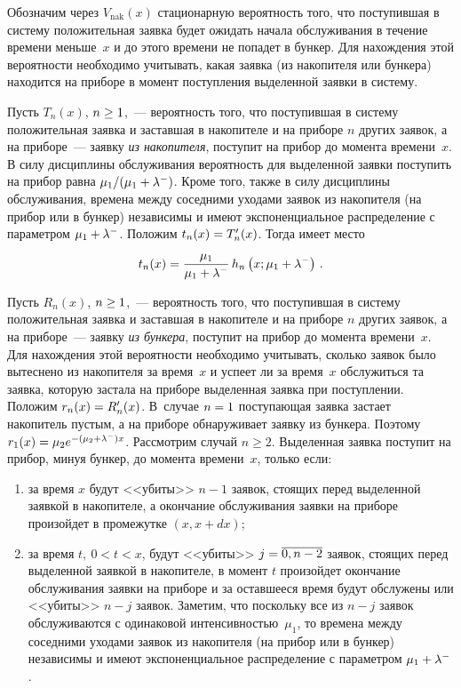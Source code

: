 \begin{multicols}{2}
Обозначим через $V_{\mathrm{nak}}(x)$ стационарную вероятность того, что
поступившая в систему положительная заявка будет ожидать начала обслуживания
в течение времени меньше~$x$ и до этого времени не попадет в бункер.
Для нахождения этой вероятности необходимо учитывать,
какая заявка (из накопителя или бункера) находится на приборе в момент
поступления выделенной заявки в систему.

Пусть $T_n(x)$, $n \hm\ge 1$,~--- вероятность того, что
поступившая в систему положительная заявка и заставшая в накопителе и на приборе
$n$ других заявок, а на приборе~--- заявку \textit{из накопителя},
поступит на прибор до момента времени~$x$.
В силу дисциплины обслуживания вероятность для выделенной заявки
поступить на прибор равна ${\mu_1/(\mu_1\hm+\lambda^-)}$.
Кроме того, также в силу дисциплины обслуживания, времена между соседними уходами заявок
из накопителя (на прибор или в бункер) независимы и имеют
экспоненциальное распределение с па\-ра\-мет\-ром $\mu_1\hm+\lambda^-$.
Положим $t_n(x)\hm=T'_n(x)$. Тогда имеет место
$$
t_n(x)= \displaystyle\frac{\displaystyle  \mu_1 \mathstrut}{\displaystyle \mu_1+\lambda^-\mathstrut}\, h_n\left(x;\mu_1+\lambda^-\right)\,.
$$

Пусть $R_n(x)$, $n \hm\ge 1$,~--- вероятность того, что поступившая в
систему положительная заявка и заставшая в накопителе и на приборе $n$ других
заявок, а на приборе~--- заявку \textit{из бункера}, поступит на
прибор до момента времени~$x$. Для нахождения этой вероятности
необходимо учитывать, сколько заявок было вытеснено из накопителя за
время~$x$ и успеет ли за время~$x$ обслужиться та заявка, которую
застала на приборе выделенная заявка при поступлении. Положим
$r_n(x)\hm=R'_n(x)$. В~случае $n\hm=1$ по\-сту\-па\-ющая заявка застает
накопитель пус\-тым, а на приборе обнаруживает заявку из бункера.
Поэтому $r_1(x)\hm= \mu_2 e^{-(\mu_2+\lambda^-) x}$. Рассмотрим случай
$n\ge2$. Выделенная заявка поступит на прибор, минуя бункер, до
момента времени~$x$, только если:
\begin{enumerate}[(1)]
\item за время $x$ будут <<убиты>> $n-1$
заявок, стоящих перед выделенной заявкой в накопителе,
а окончание обслуживания заявки на приборе произойдет
в промежутке $(x,x+dx)$;

\item за время $t, \ 0<t<x$, будут <<убиты>> $j\hm=\overline{0,n-2}$
заявок, стоящих перед выделенной заявкой в накопителе, в момент
$t$ произойдет окончание обслуживания заявки на приборе
и за оставшееся время будут обслужены или <<убиты>> $n-j$ заявок.
Заметим, что поскольку все из $n-j$ заявок обслуживаются
с одинаковой интенсивностью~$\mu_1$, то времена между соседними уходами заявок
из накопителя (на прибор или в бункер) независимы и имеют
экспоненциальное распределение с параметром $\mu_1\hm+\lambda^-$.
\end{enumerate}


\end{multicols}
